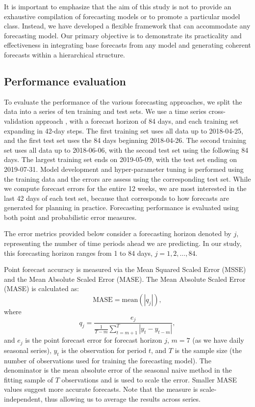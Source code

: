\documentclass[
  authoryear,
  preprint,
  3p]{elsarticle}
\begin{document}
It is important to emphasize that the aim of this study is not to
provide an exhaustive compilation of forecasting models or to promote a
particular model class. Instead, we have developed a flexible framework
that can accommodate any forecasting model. Our primary objective is to
demonstrate its practicality and effectiveness in integrating base
forecasts from any model and generating coherent forecasts within a
hierarchical structure.

\hypertarget{performance-evaluation}{%
\subsection{Performance evaluation}\label{performance-evaluation}}

To evaluate the performance of the various forecasting approaches, we
split the data into a series of ten training and test sets. We use a
time series cross-validation approach \citep{hyndman2021forecasting},
with a forecast horizon of 84 days, and each training set expanding in
42-day steps. The first training set uses all data up to 2018-04-25, and
the first test set uses the 84 days beginning 2018-04-26. The second
training set uses all data up to 2018-06-06, with the second test set
using the following 84 days. The largest training set ends on
2019-05-09, with the test set ending on 2019-07-31. Model development
and hyper-parameter tuning is performed using the training data and the
errors are assess using the corresponding test set. While we compute
forecast errors for the entire 12 weeks, we are most interested in the
last 42 days of each test set, because that corresponds to how forecasts
are generated for planning in practice. Forecasting performance is
evaluated using both point and probabilistic error measures.

The error metrics provided below consider a forecasting horizon denoted
by \(j\), representing the number of time periods ahead we are
predicting. In our study, this forecasting horizon ranges from 1 to 84
days, \(j= 1,2,\dots, 84\).

Point forecast accuracy is measured via the Mean Squared Scaled Error
(MSSE) and the Mean Absolute Scaled Error (MASE). The Mean Absolute
Scaled Error (MASE) \citep{HK06, hyndman2021forecasting} is calculated
as: \[
  \text{MASE} = \text{mean}(|q_{j}|),
\] where \[
  q_{j} = \frac{ e_{j}}
 {\displaystyle\frac{1}{T-m}\sum_{t=m+1}^T |y_{t}-y_{t-m}|},
\] and \(e_{j}\) is the point forecast error for forecast horizon \(j\),
\(m = 7\) (as we have daily seasonal series), \(y_t\) is the observation
for period \(t\), and \(T\) is the sample size (the number of
observations used for training the forecasting model). The denominator
is the mean absolute error of the seasonal naive method in the fitting
sample of \(T\) observations and is used to scale the error. Smaller
MASE values suggest more accurate forecasts. Note that the measure is
scale-independent, thus allowing us to average the results across
series.
\end{document}
